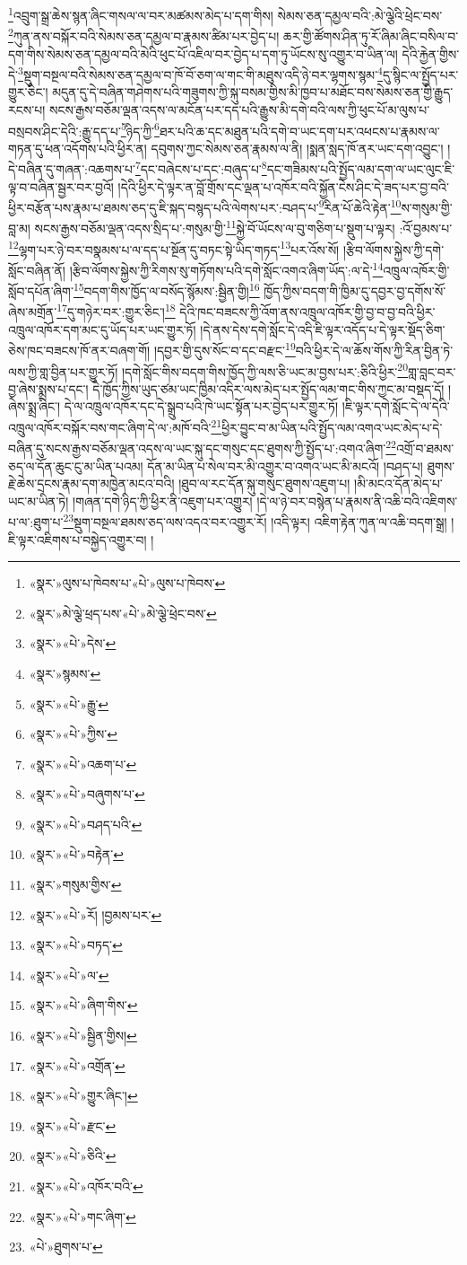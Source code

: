 \footnote{«སྣར་»ལུས་པ་ཁེབས་པ་«པེ་»ལུས་པ་ཁེབས་}འབྲུག་སྒྲ་ཆེས་སྙན་ཞིང་གསལ་ལ་བར་མཚམས་མེད་པ་དག་གིས། སེམས་ཅན་དམྱལ་བའི་:མེ་ལྕེའི་ཕྲེང་བས་\footnote{«སྣར་»མེ་ལྕེ་ཕྲད་པས་«པེ་»མེ་ལྕེ་ཕྲེང་བས་}ཀུན་ནས་བསྐོར་བའི་སེམས་ཅན་དམྱལ་བ་རྣམས་ཚིམ་པར་བྱེད་པ། ཆར་གྱི་ཚོགས་ཤིན་ཏུ་རོ་ཞིམ་ཞིང་བསིལ་བ་དག་གིས་སེམས་ཅན་དམྱལ་བའི་མེའི་ཕུང་པོ་འཇིལ་བར་བྱེད་པ་དག་ཏུ་ཡོངས་སུ་འགྱུར་བ་ཡིན་ལ། དེའི་རྐྱེན་གྱིས་དེ་\footnote{«སྣར་»«པེ་»དེས་}སྡུག་བསྔལ་བའི་སེམས་ཅན་དམྱལ་བ་ཁོ་བོ་ཅག་ལ་གང་གི་མཐུས་འདི་ཉེ་བར་ལྷགས་སྙམ་\footnote{«སྣར་»སྙམས་}དུ་སྙིང་ལ་སྤྱོད་པར་གྱུར་ཅིང་། མདུན་དུ་དེ་བཞིན་གཤེགས་པའི་གཟུགས་ཀྱི་སྐུ་བསམ་གྱིས་མི་ཁྱབ་པ་མཐོང་བས་སེམས་ཅན་གྱི་རྒྱུད་རངས་པ། སངས་རྒྱས་བཅོམ་ལྡན་འདས་ལ་མངོན་པར་དད་པའི་རྒྱུས་མི་དགེ་བའི་ལས་ཀྱི་ཕུང་པོ་མ་ལུས་པ་བསྲབས་ཤིང་དེའི་:རྒྱུ་དད་པ་\footnote{«སྣར་»«པེ་»རྒྱུ་}ཉིད་ཀྱི་\footnote{«སྣར་»«པེ་»ཀྱིས་}ཐར་པའི་ཆ་དང་མཐུན་པའི་དགེ་བ་ཡང་དག་པར་འཕངས་པ་རྣམས་ལ་གཏན་དུ་ཕན་འདོགས་པའི་ཕྱིར་ན། དབུགས་ཀྱང་སེམས་ཅན་རྣམས་ལ་ནི། །སྨན་སླད་ཁོ་ནར་ཡང་དག་འབྱུང་། །དེ་བཞིན་དུ་གཞན་:འཆགས་པ་\footnote{«སྣར་»«པེ་»འཆག་པ་}དང་བཞེངས་པ་དང་:བཞུད་པ་\footnote{«སྣར་»«པེ་»བཞུགས་པ་}དང་གཟིམས་པའི་སྤྱོད་ལམ་དག་ལ་ཡང་ལུང་ཇི་ལྟ་བ་བཞིན་སྦྱར་བར་བྱའོ། །དེའི་ཕྱིར་དེ་ལྟར་ན་བློ་གྲོས་དང་ལྡན་པ་འཁོར་བའི་སྐྱོན་ངེས་ཤིང་དེ་ཟད་པར་བྱ་བའི་ཕྱིར་བརྩོན་པས་རྣམ་པ་ཐམས་ཅད་དུ་ཇི་སྐད་བསྙད་པའི་ལེགས་པར་:བཤད་པ་\footnote{«སྣར་»«པེ་»བཤད་པའི་}རིན་པོ་ཆེའི་རྟེན་\footnote{«སྣར་»«པེ་»བརྟེན་}ས་གསུམ་གྱི་བླ་མ། སངས་རྒྱས་བཅོམ་ལྡན་འདས་སྲིད་པ་:གསུམ་གྱི་\footnote{«སྣར་»གསུམ་གྱིས་}སྐྱེ་བོ་ཡོངས་ལ་བུ་གཅིག་པ་སྡུག་པ་ལྟར། :འོ་བྱམས་པ་\footnote{«སྣར་»«པེ་»རོ། །བྱམས་པར་}ལྷག་པར་ཉེ་བར་བསྣམས་པ་ལ་དད་པ་སྔོན་དུ་བཏང་སྟེ་ཡིད་གཏད་\footnote{«སྣར་»«པེ་»བཏད་}པར་འོས་སོ། །རྩིབ་ལོགས་སྐྱེས་ཀྱི་དགེ་སློང་བཞིན་ནོ། །རྩིབ་ལོགས་སྐྱེས་ཀྱི་རིགས་སུ་གཏོགས་པའི་དགེ་སློང་འགའ་ཞིག་ཡོད་:ལ་དེ་\footnote{«སྣར་»«པེ་»ལ་}འཁྲུལ་འཁོར་གྱི་སློབ་དཔོན་ཞིག་\footnote{«སྣར་»«པེ་»ཞིག་གིས་}བདག་གིས་ཁྱོད་ལ་བསོད་སྙོམས་:སྦྱིན་གྱི།\footnote{«སྣར་»«པེ་»སྦྱིན་གྱིས།} ཁྱོད་ཀྱིས་བདག་གི་ཁྱིམ་དུ་དབྱར་བྱ་དགོས་སོ་ཞེས་མགྲོན་\footnote{«སྣར་»«པེ་»འགྲོན་}དུ་གཉེར་བར་:གྱུར་ཅིང་།\footnote{«སྣར་»«པེ་»གྱུར་ཞིང་།} དེའི་ཁང་བཟངས་ཀྱི་འོག་ནས་འཁྲུལ་འཁོར་གྱི་བྱ་བ་བྱ་བའི་ཕྱིར་འཁྲུལ་འཁོར་དག་མང་དུ་ཡོད་པར་ཡང་གྱུར་ཏོ། །དེ་ནས་དེས་དགེ་སློང་དེ་འདི་ཇི་ལྟར་འདོད་པ་དེ་ལྟར་སྡོད་ཅིག་ཅེས་ཁང་བཟངས་ཁོ་ནར་བཞག་གོ། །དབྱར་གྱི་དུས་སོང་བ་དང་བརྫང་\footnote{«སྣར་»«པེ་»རྫང་}བའི་ཕྱིར་དེ་ལ་ཆོས་གོས་ཀྱི་རིན་བྱིན་ཏེ་ལས་ཀྱི་གླ་བྱིན་པར་གྱུར་ཏོ། །དགེ་སློང་གིས་བདག་གིས་ཁྱོད་ཀྱི་ལས་ཅི་ཡང་མ་བྱས་པར་:ཅིའི་ཕྱིར་\footnote{«སྣར་»«པེ་»ཅིའི་}གླ་བླང་བར་བྱ་ཞེས་སྨྲས་པ་དང་། དེ་ཁྱོད་ཀྱིས་ཡུད་ཙམ་ཡང་ཁྱིམ་འདིར་ལས་མེད་པར་སྤྱོད་ལམ་གང་གིས་ཀྱང་མ་བསྡད་དོ། །ཞེས་སྨྲ་ཞིང་། དེ་ལ་འཁྲུལ་འཁོར་དང་དེ་སྒྲུབ་པའི་ཁེ་ཡང་སྟོན་པར་བྱེད་པར་གྱུར་ཏོ། །ཇི་ལྟར་དགེ་སློང་དེ་ལ་དེའི་འཁྲུལ་འཁོར་བསྐོར་བས་གང་ཞིག་དེ་ལ་:མཁོ་བའི་\footnote{«སྣར་»«པེ་»འཁོར་བའི་}ཕྱིར་བྱུང་བ་མ་ཡིན་པའི་སྤྱོད་ལམ་འགའ་ཡང་མེད་པ་དེ་བཞིན་དུ་སངས་རྒྱས་བཅོམ་ལྡན་འདས་ལ་ཡང་སྐུ་དང་གསུང་དང་ཐུགས་ཀྱི་སྤྱོད་པ་:འགའ་ཞིག་\footnote{«སྣར་»«པེ་»གང་ཞིག་}འགྲོ་བ་ཐམས་ཅད་ལ་དོན་ཆུང་ངུ་མ་ཡིན་པའམ། དོན་མ་ཡིན་པ་སེལ་བར་མི་འགྱུར་བ་འགའ་ཡང་མི་མངའོ། །བཤད་པ། ཐུགས་རྗེ་ཆེས་དྲངས་རྣམ་དག་མཁྱེན་མངའ་བའི། །ཐུབ་ལ་རང་དོན་སྐུ་གསུང་ཐུགས་འཇུག་པ། །མི་མངའ་དོན་མེད་པ་ཡང་མ་ཡིན་ཏེ། །གཞན་དགེ་ཉིད་ཀྱི་ཕྱིར་ནི་འཇུག་པར་འགྱུར། །དེ་ལ་ཉེ་བར་བསྙེན་པ་རྣམས་ནི་འཆི་བའི་འཇིགས་པ་ལ་:ཐུག་པ་\footnote{«པེ་»ཐུགས་པ་}སྡུག་བསྔལ་ཐམས་ཅད་ལས་འདའ་བར་འགྱུར་རོ། །འདི་ལྟར། འཇིག་རྟེན་ཀུན་ལ་འཆི་བདག་སྒྲ། །ཇི་ལྟར་འཇིགས་པ་བསྐྱེད་འགྱུར་བ། །
